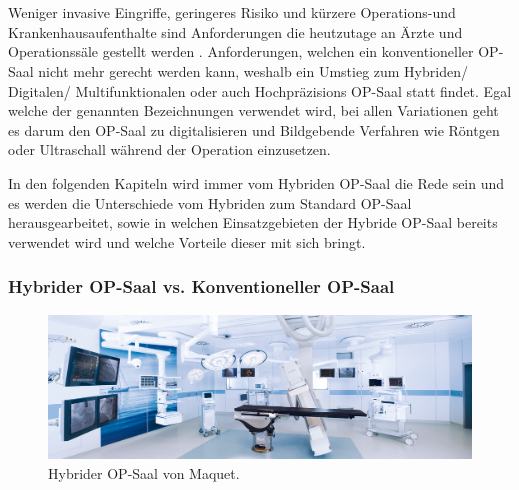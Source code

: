 \chapter{}
\label{sec:overview}

Weniger invasive Eingriffe, geringeres Risiko und kürzere Operations-und Krankenhausaufenthalte sind Anforderungen die heutzutage an Ärzte und Operationssäle gestellt werden \cite{DerDigitaleOperationssaal}. Anforderungen, welchen ein konventioneller OP-Saal nicht mehr gerecht werden kann, weshalb ein Umstieg zum Hybriden/ Digitalen/ Multifunktionalen oder auch Hochpräzisions OP-Saal statt findet. Egal welche der genannten Bezeichnungen verwendet wird, bei allen Variationen geht es darum den OP-Saal zu digitalisieren und Bildgebende Verfahren wie Röntgen oder Ultraschall während der Operation einzusetzen.

In den folgenden Kapiteln wird immer vom Hybriden OP-Saal die Rede sein und es werden die Unterschiede vom Hybriden zum Standard OP-Saal herausgearbeitet, sowie in welchen Einsatzgebieten der Hybride OP-Saal bereits verwendet wird und welche Vorteile dieser mit sich bringt.

\subsection{Hybrider OP-Saal vs. Konventioneller OP-Saal} 

\begin{figure} [H]
	\includegraphics[scale = .3]{Content/Pictures/hybrid-or.png}
	\caption{Hybrider OP-Saal von Maquet. \cite{Maquet}}
	\label{fig:hybridor}
\end{figure}

